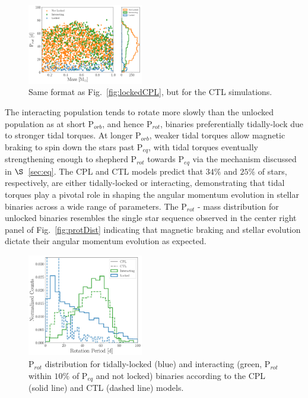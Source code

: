 \documentclass[twocolumn]{aastex61}
\begin{document}
\begin{figure}
	\includegraphics[width=0.45\textwidth]{../Plots/lockedCTL.pdf}
   \caption{Same format as Fig.~\ref{fig:lockedCPL}, but for the CTL simulations. }%
    \label{fig:lockedCTL}%
\end{figure}

The interacting population tends to rotate more slowly than the unlocked population as at short P$_{orb}$, and hence P$_{rot}$, binaries preferentially tidally-lock due to stronger tidal torques.  At longer P$_{orb}$, weaker tidal torques allow magnetic braking to spin down the stars past P$_{eq}$, with tidal torques eventually strengthening enough to shepherd P$_{rot}$ towards P$_{eq}$ via the mechanism discussed in $\S$~\ref{sec:eq}. The CPL and CTL models predict that $34\%$ and $25\%$ of stars, respectively, are either tidally-locked or interacting, demonstrating that tidal torques play a pivotal role in shaping the angular momentum evolution in stellar binaries across a wide range of parameters. The P$_{rot}$ - mass distribution for unlocked binaries resembles the single star sequence observed in the center right panel of Fig.~\ref{fig:protDist} indicating that magnetic braking and stellar evolution dictate their angular momentum evolution as expected.

\begin{figure}
	\includegraphics[width=0.45\textwidth]{../Plots/lockedProtHist.pdf}
   \caption{P$_{rot}$ distribution for tidally-locked (blue) and interacting (green, P$_{rot}$ within $10\%$ of P$_{eq}$ and not locked) binaries according to the CPL (solid line) and CTL (dashed line) models.}%
    \label{fig:lockedProtHist}%
\end{figure}
\end{document}
